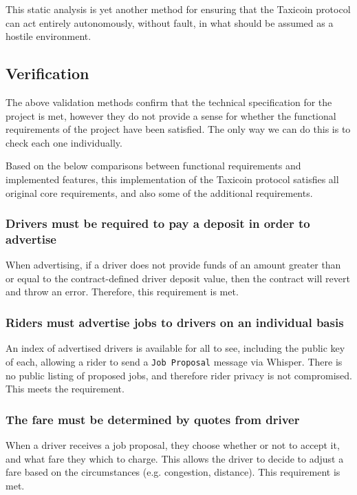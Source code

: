 This static analysis is yet another method for ensuring that the Taxicoin protocol can act entirely autonomously, without fault, in what should be assumed as a hostile environment.

\subsection{Verification}


The above validation methods confirm that the technical specification for the project is met, however they do not provide a sense for whether the functional requirements of the project have been satisfied. The only way we can do this is to check each one individually.

Based on the below comparisons between functional requirements and implemented features, this implementation of the Taxicoin protocol satisfies all original core requirements, and also some of the additional requirements.

\subsubsection*{Drivers must be required to pay a deposit in order to advertise}

When advertising, if a driver does not provide funds of an amount greater than or equal to the contract-defined driver deposit value, then the contract will revert and throw an error. Therefore, this requirement is met.

\subsubsection*{Riders must advertise jobs to drivers on an individual basis}

An index of advertised drivers is available for all to see, including the public key of each, allowing a rider to send a \lstinline{Job Proposal} message via Whisper. There is no public listing of proposed jobs, and therefore rider privacy is not compromised. This meets the requirement.

\subsubsection*{The fare must be determined by quotes from driver}

When a driver receives a job proposal, they choose whether or not to accept it, and what fare they which to charge. This allows the driver to decide to adjust a fare based on the circumstances (e.g. congestion, distance). This requirement is met.

